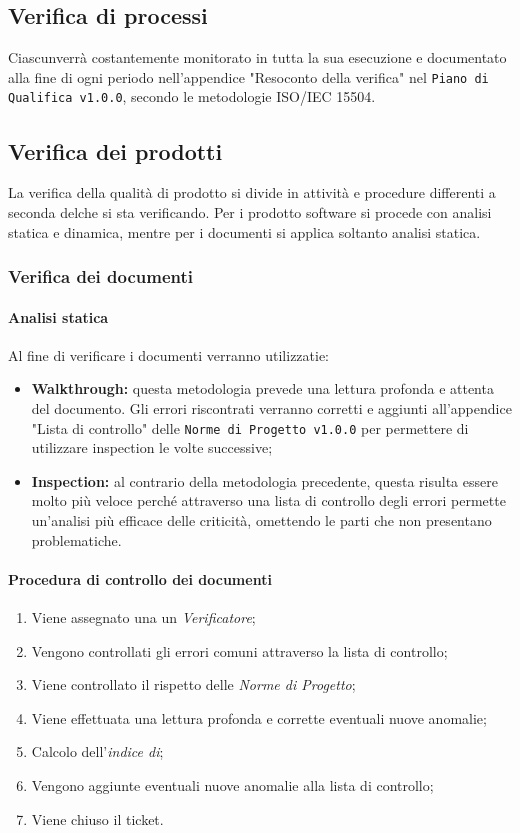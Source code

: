\subsection{Verifica di processi}
Ciascunverrà costantemente monitorato in tutta la sua esecuzione e documentato alla fine di ogni periodo nell'appendice "Resoconto della verifica" nel \texttt{Piano di Qualifica v1.0.0}, secondo le metodologie ISO/IEC 15504.



\subsection{Verifica dei prodotti}
La verifica della qualità di prodotto si divide in attività e procedure differenti a seconda delche si sta verificando. Per i prodotto software si procede con analisi statica e dinamica, mentre per i documenti si applica soltanto analisi statica.
\subsubsection{Verifica dei documenti}
\paragraph{Analisi statica}
Al fine di verificare i documenti verranno utilizzatie:
\begin{itemize}
	\item \textbf{Walkthrough:} questa metodologia prevede una lettura profonda e attenta del documento. Gli errori riscontrati verranno corretti e aggiunti all'appendice "Lista di controllo" delle \texttt{Norme di Progetto v1.0.0} per permettere di utilizzare inspection le volte successive;
	\item \textbf{Inspection:} al contrario della metodologia precedente, questa risulta essere molto più veloce perché attraverso una lista di controllo degli errori permette un'analisi più efficace delle criticità, omettendo le parti che non presentano problematiche. 
\end{itemize}
\paragraph{Procedura di controllo dei documenti}
\begin{enumerate}
	\item Viene assegnato una un \textit{Verificatore};
	\item Vengono controllati gli errori comuni attraverso la lista di controllo;
	\item Viene controllato il rispetto delle \textit{Norme di Progetto};
	\item Viene effettuata una lettura profonda e corrette eventuali nuove anomalie;
	\item Calcolo dell'\textit{indice di};
	\item Vengono aggiunte eventuali nuove anomalie alla lista di controllo;
	\item Viene chiuso il ticket.
\end{enumerate}
